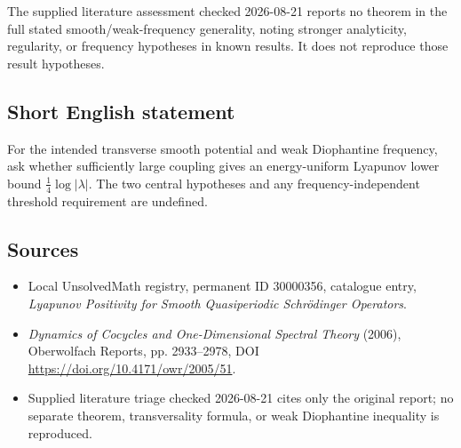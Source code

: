 \documentclass[11pt]{article}
\begin{document}
The supplied literature assessment checked 2026-08-21 reports no theorem in the full stated smooth/weak-frequency generality, noting stronger analyticity, regularity, or frequency hypotheses in known results. It does not reproduce those result hypotheses.
\subsection{Short English statement}
For the intended transverse smooth potential and weak Diophantine frequency, ask whether sufficiently large coupling gives an energy-uniform Lyapunov lower bound \(\frac14\log|\lambda|\). The two central hypotheses and any frequency-independent threshold requirement are undefined.
\subsection{Sources}
\begin{itemize}
\item Local UnsolvedMath registry, permanent ID 30000356, catalogue entry, \emph{Lyapunov Positivity for Smooth Quasiperiodic Schr\"odinger Operators}.
\item \emph{Dynamics of Cocycles and One-Dimensional Spectral Theory} (2006), Oberwolfach Reports, pp. 2933--2978, DOI \url{https://doi.org/10.4171/owr/2005/51}.
\item Supplied literature triage checked 2026-08-21 cites only the original report; no separate theorem, transversality formula, or weak Diophantine inequality is reproduced.
\end{itemize}
\end{document}
